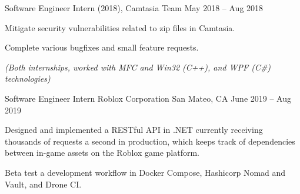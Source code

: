 \documentclass[]{awesome-cv}
\begin{document}
	\vspace{-5mm}
	\cventry
	{Software Engineer Intern (2018), Camtasia Team}
	{}
	{}
	{May 2018 – Aug 2018}
	{\begin{cvitems}
		\item {Mitigate security vulnerabilities related to zip files in Camtasia.}
		\item {Complete various bugfixes and small feature requests.}
		\item {\textit{(Both internships, worked with MFC and Win32 (C++), and WPF (C\#) technologies)}}
	\end{cvitems}}

	\vspace{-4mm}
	\cventry
	{Software Engineer Intern}
	{Roblox Corporation}
	{San Mateo, CA}
	{June 2019 – Aug 2019}
	{\begin{cvitems}
		\item {Designed and implemented a RESTful API in .NET currently receiving thousands of requests a second in production,
		 which keeps track of dependencies between in-game assets on the Roblox game platform.}
		\item {Beta test a development workflow in Docker Compose, Hashicorp 
		Nomad and Vault, and Drone CI.}
	\end{cvitems}}

	



\end{document}
